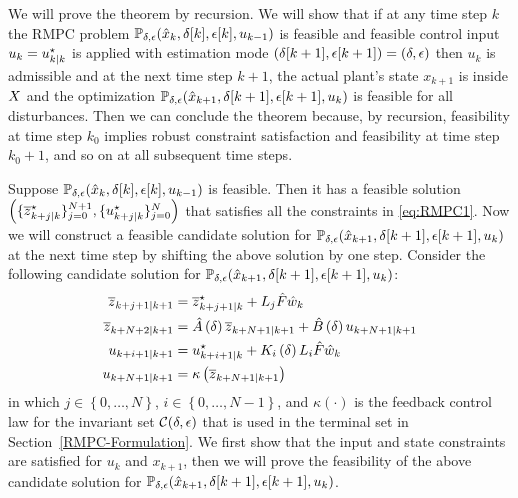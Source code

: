 %
We will prove the theorem by recursion. We will show that if at any
time step $k$ the RMPC problem $\mathbb{P_{\delta,\epsilon}}(\hat{x}_{k},\delta[k],\epsilon[k],u_{k-1})$
is feasible and feasible control input $u_{k}=u_{k| k}^{\star}$
is applied with estimation mode $\left(\delta[k+1],\epsilon[k+1]\right)=\left(\delta,\epsilon\right)$
then $u_{k}$ is admissible and at the next time step $k+1$, the
actual plant's state $x_{k+1}$ is inside $X$ and the optimization
$\mathbb{P_{\delta,\epsilon}}(\hat{x}_{k+1},\delta[k+1],\epsilon[k+1],u_{k})$
is feasible for all disturbances. Then we can conclude the theorem
because, by recursion, feasibility at time step $k_{0}$ implies robust
constraint satisfaction and feasibility at time step $k_{0}+1$, and
so on at all subsequent time steps.

Suppose $\mathbb{P_{\delta,\epsilon}}(\hat{x}_{k},\delta[k],\epsilon[k],u_{k-1})$
is feasible. Then it has a feasible solution $\left(\{ \overline{z}_{k+j| k}^{\star}\} _{j=0}^{N+1},\{ u_{k+j| k}^{\star}\} _{j=0}^{N}\right)$
that satisfies all the constraints in \eqref{eq:RMPC1}. Now we will
construct a feasible candidate solution for $\mathbb{P_{\delta,\epsilon}}(\hat{x}_{k+1},\delta[k+1],\epsilon[k+1],u_{k})$
at the next time step by shifting the above solution by one step.
Consider the following candidate solution for $\mathbb{P_{\delta,\epsilon}}(\hat{x}_{k+1},\delta[k+1],\epsilon[k+1],u_{k})$:
\begin{subequations}
\label{eq:proofs:candidate-solution}
\begin{align}
\overline{z}_{k+j+1| k+1} & =\overline{z}_{k+j+1| k}^{\star}+L_{j}\hat{F}\hat{w}_{k}\label{eq:proofs:candidate-solution:zj}\\
\overline{z}_{k+N+2| k+1} & =\hat{A}\left(\delta\right)\overline{z}_{k+N+1| k+1}+\hat{B}\left(\delta\right)u_{k+N+1| k+1}\label{eq:proofs:candidate-solution:zN}\\
u_{k+i+1| k+1} & =u_{k+i+1| k}^{\star}+K_{i}\left(\delta\right)L_{i}\hat{F}\hat{w}_{k}\label{eq:proofs:candidate-solution:uj}\\
u_{k+N+1| k+1} & =\kappa\left(\overline{z}_{k+N+1| k+1}\right)\label{eq:proofs:candidate-solution:uN}
\end{align}
\end{subequations} in which
$j\in\left\{ 0,\dots,N\right\} $, $i\in\left\{ 0,\dots,N-1\right\} $,
and $\kappa\left(\cdot\right)$ is the feedback control law for the
invariant set $\mathcal{C}(\delta,\epsilon)$ that is used in the terminal
set in Section~\ref{RMPC-Formulation}. We first show that the input and
state constraints are satisfied for $u_{k}$ and $x_{k+1}$, then
we will prove the feasibility of the above candidate solution for
$\mathbb{P_{\delta,\epsilon}}(\hat{x}_{k+1},\delta[k+1],\epsilon[k+1],u_{k})$.

